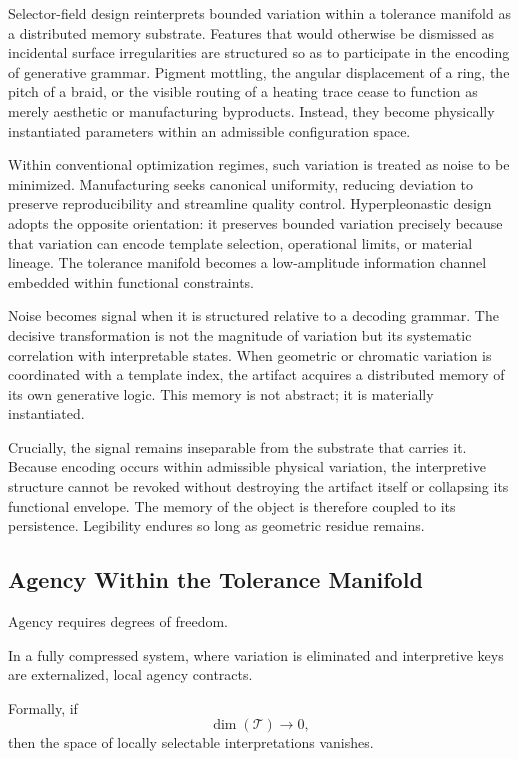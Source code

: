 \documentclass[11pt]{article}
\begin{document}
Selector-field design reinterprets bounded variation within a tolerance
manifold as a distributed memory substrate. Features that would
otherwise be dismissed as incidental surface irregularities are
structured so as to participate in the encoding of generative grammar.
Pigment mottling, the angular displacement of a ring, the pitch of a
braid, or the visible routing of a heating trace cease to function as
merely aesthetic or manufacturing byproducts. Instead, they become
physically instantiated parameters within an admissible configuration
space.

Within conventional optimization regimes, such variation is treated as
noise to be minimized. Manufacturing seeks canonical uniformity,
reducing deviation to preserve reproducibility and streamline quality
control. Hyperpleonastic design adopts the opposite orientation: it
preserves bounded variation precisely because that variation can encode
template selection, operational limits, or material lineage. The
tolerance manifold becomes a low-amplitude information channel embedded
within functional constraints.

Noise becomes signal when it is structured relative to a decoding
grammar. The decisive transformation is not the magnitude of variation
but its systematic correlation with interpretable states. When
geometric or chromatic variation is coordinated with a template index,
the artifact acquires a distributed memory of its own generative logic.
This memory is not abstract; it is materially instantiated.

Crucially, the signal remains inseparable from the substrate that
carries it. Because encoding occurs within admissible physical
variation, the interpretive structure cannot be revoked without
destroying the artifact itself or collapsing its functional envelope.
The memory of the object is therefore coupled to its persistence.
Legibility endures so long as geometric residue remains.

\subsection{Agency Within the Tolerance Manifold}

Agency requires degrees of freedom.

In a fully compressed system, where variation is eliminated
and interpretive keys are externalized, local agency contracts.

Formally, if
\[
\dim(\mathcal{T}) \rightarrow 0,
\]
then the space of locally selectable interpretations vanishes.
\end{document}
